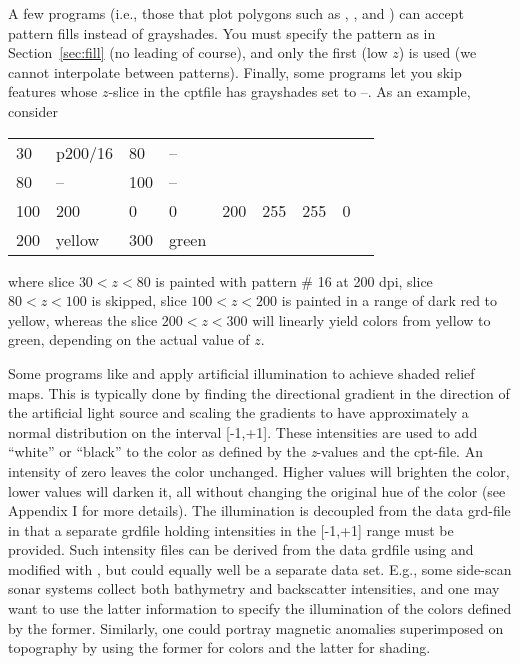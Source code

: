 A few programs (i.e., those that plot polygons such as ,
, and ) can accept pattern fills instead
of grayshades.  You must specify the pattern as in Section~\ref{sec:fill} (no
leading  of course), and only the first (low $z$) is used (we cannot
interpolate between patterns).  
Finally, some programs let you skip features
whose $z$-slice in the cptfile has grayshades set to --.  As an example,
consider

\begin{center}
\begin{tabular}{lllllllll}
30 &  p200/16 &  80 & -- \\ 
80 &  -- &  100 &  -- \\
100 &  200 &  0  &  0  &  200 &  255 &  255  &  0 \\
200 &  yellow &  300 & green  \\ 
\end{tabular} 
\end{center}
\noindent
where slice $30 < z < 80$ is painted with pattern \# 16 at 200 dpi,
slice $80 < z < 100$ is skipped, slice $100 < z < 200$ is
painted in a range of dark red to yellow, whereas the slice $200 < z < 300$
will linearly yield colors from yellow to green, depending on the actual value
of $z$.



Some programs like  and  apply artificial
illumination to achieve shaded relief maps.  This is typically done
by finding the directional gradient in the direction of the artificial
light source and scaling the gradients to have approximately a normal
distribution on the interval [-1,+1].  These intensities are used
to add ``white'' or ``black'' to the color as defined by the {\it z}-values
and the cpt-file.  An intensity of zero leaves the color unchanged.
Higher values will brighten the color, lower values will darken it,
all without changing the original hue of the color (see Appendix I
for more details).  The illumination is decoupled from the data
grd-file in that a separate grdfile holding intensities in the
[-1,+1] range must be provided.  Such intensity files can be
derived from the data grdfile using  and modified
with , but could equally well be a separate data set.
E.g., some side-scan sonar systems collect both bathymetry and
backscatter intensities, and one may want to use the latter information
to specify the illumination of the colors defined by the former.
Similarly, one could portray magnetic anomalies superimposed on
topography by using the former for colors and the latter for shading. 

